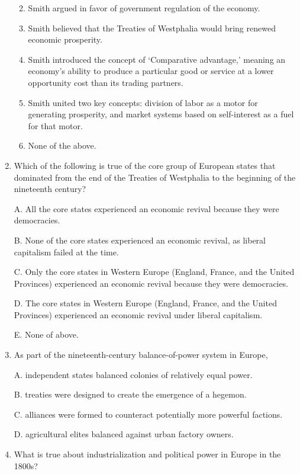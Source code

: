 \documentclass[
]{book}
\begin{document}
\begin{enumerate}
  \begin{enumerate}
  \def\labelenumii{\Alph{enumii}.}
  \item
    Smith argued in favor of government regulation of the economy.
  \item
    Smith believed that the Treaties of Westphalia would bring renewed economic prosperity.
  \item
    Smith introduced the concept of `Comparative advantage,' meaning an economy's ability to produce a particular good or service at a lower opportunity cost than its trading partners.
  \item
    Smith united two key concepts: division of labor as a motor for generating prosperity, and market systems based on self-interest as a fuel for that motor.
  \item
    None of the above.
  \end{enumerate}
\item
  Which of the following is true of the core group of European states that dominated from the end of the Treaties of Westphalia to the beginning of the nineteenth century?

  A. All the core states experienced an economic revival because they were democracies.

  B. None of the core states experienced an economic revival, as liberal capitalism failed at the time.

  C. Only the core states in Western Europe (England, France, and the United Provinces) experienced an economic revival because they were democracies.

  D. The core states in Western Europe (England, France, and the United Provinces) experienced an economic revival under liberal capitalism.

  E. None of above.
\item
  As part of the nineteenth-century balance-of-power system in Europe,

  A. independent states balanced colonies of relatively equal power.

  B. treaties were designed to create the emergence of a hegemon.

  C. alliances were formed to counteract potentially more powerful factions.

  D. agricultural elites balanced against urban factory owners.
\item
  What is true about industrialization and political power in Europe in the 1800s?


\end{enumerate}
\end{document}
